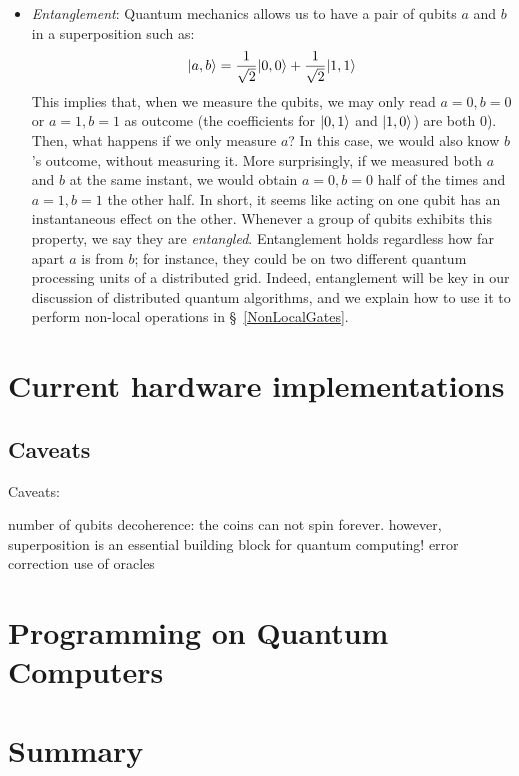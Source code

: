 \begin{itemize}
  \item \textit{Entanglement}: Quantum mechanics allows us to have a pair of qubits \(a\) and \(b\) in a superposition such as: \[\vert a,b \rangle = \frac{1}{\sqrt{2}}\vert 0,0 \rangle + \frac{1}{\sqrt{2}}\vert 1,1 \rangle\] This implies that, when we measure the qubits, we may only read \(a=0, b=0\) or \(a=1, b=1\) as outcome (the coefficients for \(\vert 0,1 \rangle\) and \(\vert 1,0 \rangle\)) are both \(0\)). Then, what happens if we only measure \(a\)? In this case, we would also know \(b\)'s outcome, without measuring it. More surprisingly, if we measured both \(a\) and \(b\) at the same instant, we would obtain \(a=0, b=0\) half of the times and \(a=1, b=1\) the other half. In short, it seems like acting on one qubit has an instantaneous effect on the other. Whenever a group of qubits exhibits this property, we say they are \textit{entangled}. Entanglement holds regardless how far apart \(a\) is from \(b\); for instance, they could be on two different quantum processing units of a distributed grid. Indeed, entanglement will be key in our discussion of distributed quantum algorithms, and we explain how to use it to perform non-local operations in \S~\ref{NonLocalGates}.


\end{itemize}


\section{Current hardware implementations}

\subsection{Caveats}
\label{Caveats}
Caveats:

number of qubits
decoherence: the coins can not spin forever. however, superposition is an essential building block for quantum computing!
error correction
use of oracles

\section{Programming on Quantum Computers}



\section{Summary}
